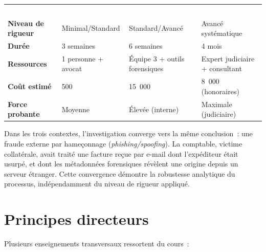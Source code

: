 \documentclass[11pt, a4paper]{article}
\begin{document}
\vspace{3pt}
\begin{tabularx}{\linewidth}{%
  >{\bfseries\small}p{3.0cm}
  >{\small}X >{\small}X >{\small}X}
  \rowcolor{bleuMoyen}
  \textcolor{white}{\textbf{Dimension}} &
  \textcolor{white}{\textbf{Particulier}} &
  \textcolor{white}{\textbf{Entreprise}} &
  \textcolor{white}{\textbf{Judiciaire}} \\[1pt]
  \rowcolor{bleuClair}
  Niveau de rigueur & Minimal/Standard & Standard/Avanc\'{e} & Avanc\'{e} syst\'{e}matique \\
  \rowcolor{white}
  Dur\'{e}e & 3 semaines & 6 semaines & 4 mois \\
  \rowcolor{bleuClair}
  Ressources & 1 personne + avocat & \'{E}quipe 3 + outils forensiques & Expert judiciaire + consultant \\
  \rowcolor{white}
  Co\^{u}t estim\'{e} & 500~\texteuro{} & 15~000~\texteuro{} & 8~000~\texteuro{} (honoraires) \\
  \rowcolor{bleuClair}
  Force probante & Moyenne & \'{E}lev\'{e}e (interne) & Maximale (judiciaire) \\
\end{tabularx}
\vspace{3pt}

Dans les trois contextes, l'investigation converge vers la m\^{e}me conclusion~:
une fraude externe par hame\c{c}onnage (\textit{phishing/spoofing}). La comptable,
victime collat\'{e}rale, avait trait\'{e} une facture re\c{c}ue par e-mail dont
l'exp\'{e}diteur \'{e}tait usurp\'{e}, et dont les m\'{e}tadonn\'{e}es forensiques
r\'{e}v\`{e}lent une origine depuis un serveur \'{e}tranger. Cette convergence
d\'{e}montre la robustesse analytique du processus, ind\'{e}pendamment du niveau
de rigueur appliqu\'{e}.

\section{Principes directeurs}

Plusieurs enseignements transversaux ressortent du cours~:
\end{document}
